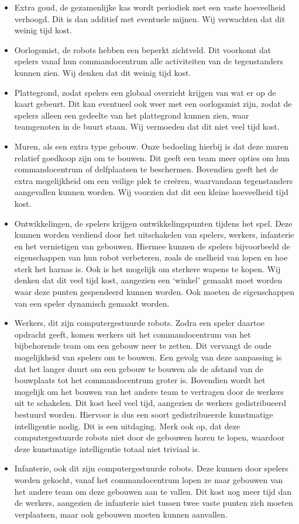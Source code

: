 \begin{itemize}
  \item Extra goud, de gezamenlijke kas wordt periodiek met een vaste hoeveelheid verhoogd. Dit is dan additief met eventuele mijnen. Wij verwachten dat dit weinig tijd kost.
  \item Oorlogsmist, de robots hebben een beperkt zichtveld. Dit voorkomt dat spelers vanaf hun commandocentrum alle activiteiten van de tegenstanders kunnen zien. Wij denken dat dit weinig tijd kost.
  \item Plattegrond, zodat spelers een globaal overzicht krijgen van wat er op de kaart gebeurt. Dit kan eventueel ook weer met een oorlogsmist zijn, zodat de spelers alleen een gedeelte van het plattegrond kunnen zien, waar teamgenoten in de buurt staan. Wij vermoeden dat dit niet veel tijd kost.
  \item Muren, als een extra type gebouw. Onze bedoeling hierbij is dat deze muren relatief goedkoop zijn om te bouwen. Dit geeft een team meer opties om hun commandocentrum of delfplaatsen te beschermen. Bovendien geeft het de extra mogelijkheid om een veilige plek te cre\"eren, waarvandaan tegenstanders aangevallen kunnen worden. Wij voorzien dat dit een kleine hoeveelheid tijd kost.
  \item Ontwikkelingen, de spelers krijgen ontwikkelingspunten tijdens het spel. Deze kunnen worden verdiend door het uitschakelen van spelers, werkers, infanterie en het vernietigen van gebouwen. Hiermee kunnen de spelers bijvoorbeeld de eigenschappen van hun robot verbeteren, zoals de snelheid van lopen en hoe sterk het harnas is. Ook is het mogelijk om sterkere wapens te kopen. Wij denken dat dit veel tijd kost, aangezien een `winkel' gemaakt moet worden waar deze punten gespendeerd kunnen worden. Ook moeten de eigenschappen van een speler dynamisch gemaakt worden.
  \item Werkers, dit zijn computergestuurde robots. Zodra een speler daartoe opdracht geeft, komen werkers uit het commandocentrum van het bijbehorende team om een gebouw neer te zetten. Dit vervangt de oude mogelijkheid van spelers om te bouwen. Een gevolg van deze aanpassing is dat het langer duurt om een gebouw te bouwen als de afstand van de bouwplaats tot het commandocentrum groter is. Bovendien wordt het mogelijk om het bouwen van het andere team te vertragen door de werkers uit te schakelen. Dit kost heel veel tijd, aangezien de werkers gedistribueerd bestuurd worden. Hiervoor is dus een soort gedistribueerde kunstmatige intelligentie nodig. Dit is een uitdaging. Merk ook op, dat deze computergestuurde robots niet door de gebouwen horen te lopen, waardoor deze kunstmatige intelligentie totaal niet triviaal is.
  \item Infanterie, ook dit zijn computergestuurde robots. Deze kunnen door spelers worden gekocht, vanaf het commandocentrum lopen ze naar gebouwen van het andere team om deze gebouwen aan te vallen. Dit kost nog meer tijd dan de werkers, aangezien de infanterie niet tussen twee vaste punten zich moeten verplaatsen, maar ook gebouwen moeten kunnen aanvallen.
\end{itemize} 